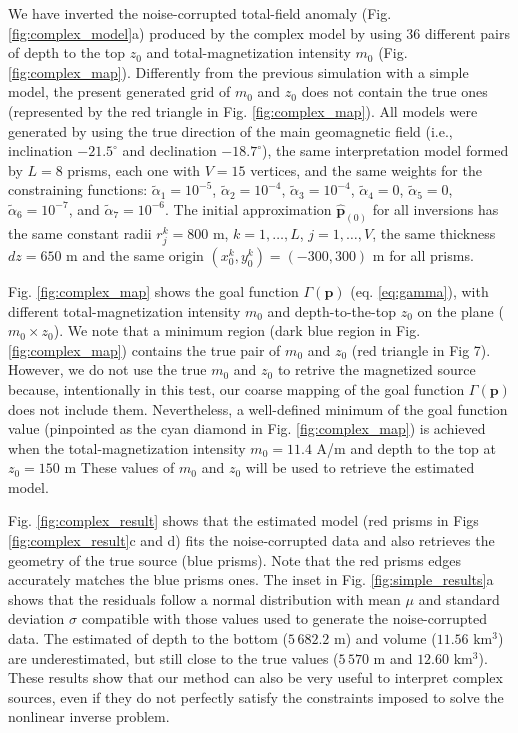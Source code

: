 We have inverted the noise-corrupted total-field anomaly (Fig. \ref{fig:complex_model}a) produced by the complex model by using 36 different pairs of depth to the top $ z_0 $
and total-magnetization intensity $ m_0 $ (Fig. \ref{fig:complex_map}). Differently from the previous simulation with a simple model, the present generated grid of $ m_0 $ and $ z_0 $ does not contain the true ones (represented by the red triangle in Fig. \ref{fig:complex_map}). All models were generated by using the true direction of the main geomagnetic field (i.e., inclination $ -21.5^\circ $ and declination $ -18.7^\circ $), the same interpretation model formed by $ L = 8 $ prisms, each one with $ V = 15 $ vertices, and the same weights for the constraining functions: $\tilde{\alpha}_1 = 10^{-5}$, $\tilde{\alpha}_2 = 10^{-4}$, $\tilde{\alpha}_3 = 10^{-4}$, $\tilde{\alpha}_4 = 0$, $\tilde{\alpha}_5 = 0$, $\tilde{\alpha}_6 = 10^{-7}$, and $\tilde{\alpha}_7 = 10^{-6}$. The initial approximation $ \hat{\mathbf{p}}_{(0)} $ for all inversions has the same constant radii $ r^k_j = 800 $ m, $ k = 1, \dots, L $, $ j = 1, \dots, V $, the same thickness $ dz = 650 $ m and the same origin $ (x^k_0, y^k_0) = (-300, 300) $ m for all prisms.

Fig. \ref{fig:complex_map} shows the goal function $ \Gamma(\mathbf{p}) $ (eq. \ref{eq:gamma}),
with different total-magnetization intensity $ m_0 $ and depth-to-the-top $z_0$ on the plane ($ m_0 \times z_0 $). We note that a minimum region (dark blue region in Fig. \ref{fig:complex_map}) contains the true pair of $ m_0 $ and  $ z_0 $  (red triangle  in Fig 7). However, we do not use the true  $ m_0 $ and $ z_0 $ to retrive the magnetized source because, intentionally in this test, our coarse mapping of the goal function $ \Gamma(\mathbf{p}) $ does not  include them.  Nevertheless, a well-defined minimum of the goal function value (pinpointed as the cyan diamond in Fig. \ref{fig:complex_map}) is achieved when the total-magnetization intensity $ m_0 = 11.4 $ A/m and depth to the top at $  z_0 = 150 $ m
These values of $ m_0 $ and $ z_0 $ will be used to retrieve the estimated model.

Fig. \ref{fig:complex_result} shows that the estimated model (red prisms in Figs \ref{fig:complex_result}c and d) fits the noise-corrupted data and also retrieves the geometry of the true source (blue prisms). 
Note that the red prisms edges accurately matches the blue prisms ones. 
The inset in Fig. \ref{fig:simple_results}a shows that the residuals follow a normal 
distribution with mean $ \mu $ and standard deviation $ \sigma $ compatible with those 
values used to generate the noise-corrupted data. 
The estimated of depth to the bottom  ($ 5\,682.2 $ m) and volume ($ 11.56 $ km$^3 $) are underestimated, but still close to the true values ($ 5\,570 $ m and $ 12.60 $ km$^3 $). 
These results show that our method can also be very useful to interpret complex sources, even if they do not perfectly satisfy the constraints imposed to solve the nonlinear inverse problem.